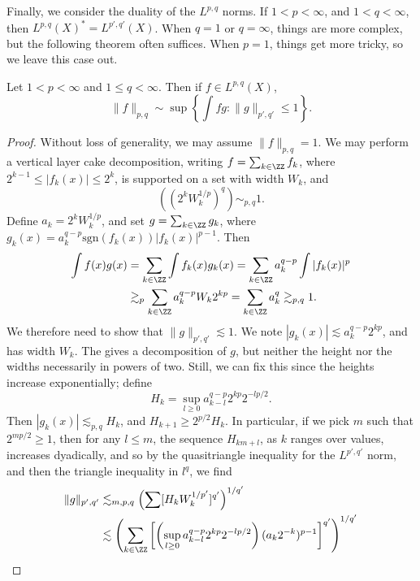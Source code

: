 Finally, we consider the duality of the $L^{p,q}$ norms. If $1 < p < \infty$, and $1 < q < \infty$, then $L^{p,q}(X)^* = L^{p',q'}(X)$. When $q = 1$ or $q = \infty$, things are more complex, but the following theorem often suffices. When $p = 1$, things get more tricky, so we leave this case out.

\begin{theorem}
    Let $1 < p < \infty$ and $1 \leq q < \infty$. Then if $f \in L^{p,q}(X)$,
    \[ \| f \|_{p,q} \sim \sup \left\{ \int fg : \| g \|_{p',q'} \leq 1 \right\}. \]
\end{theorem}
\begin{proof}
    Without loss of generality, we may assume $\| f \|_{p,q} = 1$. We may perform a vertical layer cake decomposition, writing $f = \sum_{k \in \ZZ} f_k$, where $2^{k-1} \leq |f_k(x)| \leq 2^k$, is supported on a set with width $W_k$, and
    \[ \left( (2^k W_k^{1/p})^q \right) \sim_{p,q} 1. \]
    Define $a_k = 2^k W_k^{1/p}$, and set $g = \sum_{k \in \ZZ} g_k$, where $g_k(x) = a_k^{q-p} \text{sgn}(f_k(x)) |f_k(x)|^{p-1}$. Then
    \begin{align*}
        \int f(x) g(x) &= \sum_{k \in \ZZ} \int f_k(x) g_k(x) = \sum_{k \in \ZZ} a_k^{q-p} \int |f_k(x)|^p\\
        &\gtrsim_p \sum_{k \in \ZZ} a_k^{q-p} W_k 2^{kp} = \sum_{k \in \ZZ} a_k^q \gtrsim_{p,q} 1.
    \end{align*}
    We therefore need to show that $\| g \|_{p',q'} \lesssim 1$. We note $|g_k(x)| \lesssim a_k^{q-p} 2^{kp}$, and has width $W_k$. The gives a decomposition of $g$, but neither the height nor the widths necessarily in powers of two. Still, we can fix this since the heights increase exponentially; define
    \[ H_k = \sup_{l \geq 0} a_{k-l}^{q-p} 2^{kp} 2^{-lp/2}. \]
    Then $|g_k(x)| \lesssim_{p,q} H_k$, and $H_{k+1} \geq 2^{p/2} H_k$. In particular, if we pick $m$ such that $2^{mp/2} \geq 1$, then for any $l \leq m$, the sequence $H_{km + l}$, as $k$ ranges over values, increases dyadically, and so by the quasitriangle inequality for the $L^{p',q'}$ norm, and then the triangle inequality in $l^q$, we find
    \begin{align*}
        \| g \|_{p',q'} &\lesssim_{m,p,q} \left( \sum [H_k W_k^{1/p'}]^{q'} \right)^{1/q'}\\
        &\lesssim \left( \sum_{k \in \ZZ} \left[ \left( \sup_{l \geq 0} a_{k-l}^{q-p} 2^{kp} 2^{-lp/2} \right) (a_k 2^{-k})^{p-1} \right]^{q'} \right)^{1/q'}\\

\end{align*}
\end{proof}
